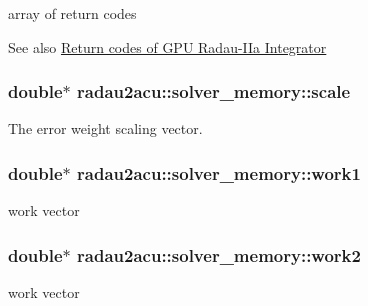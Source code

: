 array of return codes 

\begin{DoxySeeAlso}{See also}
\hyperlink{group__RKCU__ErrCodes}{Return codes of G\+P\+U Radau-\/\+I\+Ia Integrator} 
\end{DoxySeeAlso}
\subsubsection[{\texorpdfstring{scale}{scale}}]{\setlength{\rightskip}{0pt plus 5cm}double$\ast$ radau2acu\+::solver\+\_\+memory\+::scale}\hypertarget{structradau2acu_1_1solver__memory_a926e0233a4ea4622cd5114d00b0742ae}{}\label{structradau2acu_1_1solver__memory_a926e0233a4ea4622cd5114d00b0742ae}


The error weight scaling vector. 

\subsubsection[{\texorpdfstring{work1}{work1}}]{\setlength{\rightskip}{0pt plus 5cm}double$\ast$ radau2acu\+::solver\+\_\+memory\+::work1}\hypertarget{structradau2acu_1_1solver__memory_a2512e6fe1af56ee636bd449272292281}{}\label{structradau2acu_1_1solver__memory_a2512e6fe1af56ee636bd449272292281}


work vector 

\subsubsection[{\texorpdfstring{work2}{work2}}]{\setlength{\rightskip}{0pt plus 5cm}double$\ast$ radau2acu\+::solver\+\_\+memory\+::work2}\hypertarget{structradau2acu_1_1solver__memory_a835223221d3f704f6cac19ef71888700}{}\label{structradau2acu_1_1solver__memory_a835223221d3f704f6cac19ef71888700}


work vector 

